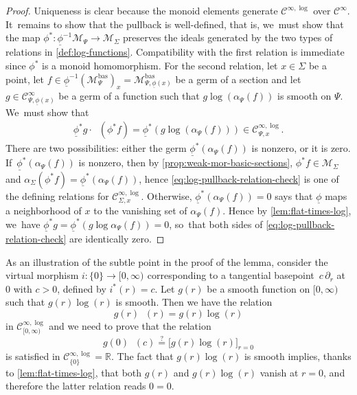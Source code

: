 \documentclass[10pt]{amsart}
\theoremstyle{definition}
\theoremstyle{remark}
\newenvironment{example}
  {\pushQED{\qed}\renewcommand{\qedsymbol}{$\lozenge$}\examplex}
  {\popQED\endexamplex}
\newcommand{\RR}{\mathbb{R}}
\newcommand{\halfspc}[1]{[0,\infty)^{#1}}
\newcommand{\ulog}{\mathop{\widetilde{\log}}\nolimits}
\newcommand{\rbrac}[1]{\left(#1\right)}
\newcommand{\cM}{\mathscr{M}}
\newcommand{\cMbas}{\mathscr{M}^{\mathrm{bas}}}
\newcommand{\Cinf}[1]{\mathscr{C}^{\infty}_{#1}}
\newcommand{\Cinflog}[1]{\mathscr{C}^{\infty,\log}_{#1}}
\newcommand{\cvf}[1]{\partial_{#1}}
\newcommand{\Sig}{\Sigma}
\newcommand{\uphi}{\underline{\phi}}
\begin{document}
\begin{proof}
Uniqueness is clear because the monoid elements generate $\Cinflog{}$ over $\Cinf{}$. It~remains to show that the pullback is well-defined, that is, we~must show that the map $\phi^*\colon \uphi^{-1}\cM_{\Psi} \to \cM_\Sig$ preserves the ideals generated by the two types of relations in \autoref{def:log-functions}. Compatibility with the first relation is immediate since $\phi^*$ is a monoid homomorphism. For the second relation, let $x \in \Sig$ be a point, let $f \in \uphi^{-1}(\cMbas_{\Psi})_x = \cMbas_{\Psi,\uphi(x)}$ be a germ of a section and let $g \in \Cinf{\Psi,\uphi(x)}$ be a germ of a function such that $g \log(\alpha_\Psi(f))$ is smooth on $\Psi$. We~must show that
\begin{align}\label{eq:log-pullback-relation-check}
\uphi^*g\cdot \ulog(\phi^*f) = \uphi^*\rbrac{g\log\rbrac{\alpha_\Psi(f)}} \in \Cinflog{\Psi,x}.
\end{align}
There are two possibilities: either the germ $\uphi^*(\alpha_{\Psi}(f))$ is nonzero, or it is zero. If~$\uphi^*(\alpha_{\Psi}(f))$ is nonzero, then by \autoref{prop:weak-mor-basic-sections}, $\phi^*f\!\in\! \cM_\Sig$ and $\alpha_{\Sig}(\phi^*f)\!=\!\uphi^*(\alpha_\Psi(f))$, hence \eqref{eq:log-pullback-relation-check} is one of the defining relations for $\Cinflog{\Sig,x}$. Otherwise, $\uphi^*(\alpha_\Psi(f)) = 0$ says that $\uphi$ maps a neighborhood of $x$ to the vanishing set of $\alpha_\Psi(f)$. Hence by \autoref{lem:flat-times-log}, we~have $\uphi^*g = \uphi^*(g \log \alpha_\Psi(f)) =0$, so~that both sides of \eqref{eq:log-pullback-relation-check} are identically zero.
\end{proof}

\begin{example}
As an illustration of the subtle point in the proof of the lemma, consider the virtual morphism $i\colon\{0\}\to \halfspc{}$ corresponding to a tangential basepoint~$c\,\cvf{r}$ at $0$ with $c>0$, \ie defined by $i^*(r)=c$. Let $g(r)$ be a smooth function on $\halfspc{}$ such that $g(r)\log(r)$ is smooth. Then we have the relation
\[
g(r)\ulog(r)=g(r)\log(r)
\]
in $\Cinflog{\halfspc{}}$ and we need to prove that the relation
\[
g(0)\ulog(c)\stackrel{?}{=}\big[g(r)\log(r)\big]_{r=0}
\]
is satisfied in $\Cinflog{\{0\}}=\RR$. The fact that $g(r)\log(r)$ is smooth implies, thanks to \autoref{lem:flat-times-log}, that both $g(r)$ and $g(r)\log(r)$ vanish at $r=0$, and therefore the latter relation reads $0=0$.
\end{example}
\end{document}
